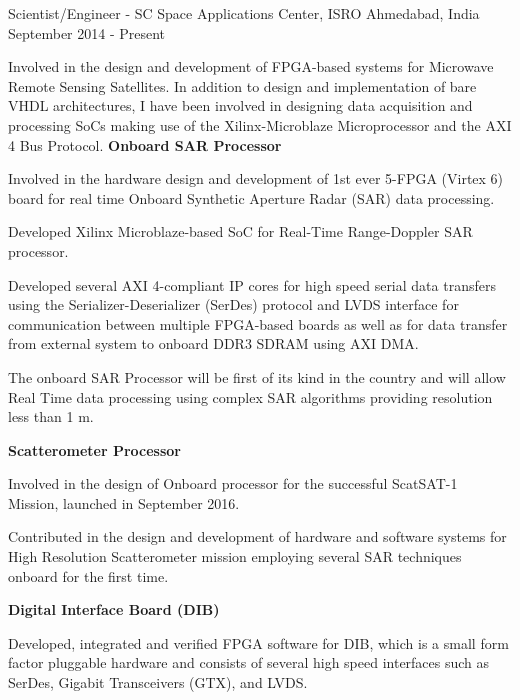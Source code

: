 \begin{cventries}
  \cventry
    {Scientist/Engineer - SC}
    {Space Applications Center, ISRO}
    {Ahmedabad, India}
    {September 2014 - Present}
    {Involved in the design and development of FPGA-based systems for Microwave Remote Sensing Satellites.  In addition to design and implementation of bare VHDL
architectures, I have been involved in designing data acquisition and processing SoCs making use of the Xilinx-Microblaze Microprocessor and the AXI 4 Bus
Protocol. \linebreak
	\textbf{Onboard SAR Processor} \linebreak
     \begin{cvitems}
        \item {Involved in the hardware design and development of 1st ever 5-FPGA (Virtex 6) board for real time Onboard Synthetic Aperture Radar (SAR) data
        processing.}
        \item {Developed Xilinx Microblaze-based SoC for Real-Time Range-Doppler SAR processor.}
        \item {Developed several AXI 4-compliant IP cores for high speed serial data transfers using the Serializer-Deserializer (SerDes) protocol and LVDS interface for communication between multiple FPGA-based boards as well as for data transfer from external system to onboard DDR3 SDRAM using AXI DMA.}   
        \item {The onboard SAR Processor will be first of its kind in the country and will allow Real Time data processing using complex SAR algorithms providing resolution less than 1 m.}
        \item[]
    \end{cvitems} 
    \textbf{Scatterometer Processor} \linebreak
    \begin{cvitems}
    	\item {Involved in the design of Onboard processor for the successful ScatSAT-1 Mission, launched in September 2016.}
        \item{ Contributed in the design and development of hardware and software systems for High Resolution Scatterometer mission employing several SAR techniques onboard for the first time.}
        \item[]
    \end{cvitems}
    \textbf{Digital Interface Board (DIB)} \linebreak
    \begin{cvitems}
    	\item{Developed, integrated and verified FPGA software for DIB, which is a small form factor pluggable hardware and consists of several high speed interfaces such as SerDes, Gigabit Transceivers (GTX), and LVDS.}

\end{cvitems}}
\end{cventries}

